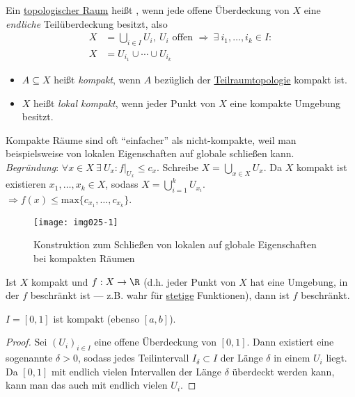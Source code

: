 \begin{definition}
  \label{def:kompakt}
  Ein \hyperref[def:topologie]{topologischer Raum} heißt , wenn jede offene Überdeckung von $ X $ eine \emph{endliche} Teilüberdeckung besitzt, also
  \begin{align*}
    X &= \bigcup_{i \in I} U_i, \ U_i \text{ offen } \Rightarrow \ \exists \ i_1, \dots, i_k \in I : \\
    X &= U_{i_1} \cup \cdots \cup U_{i_k}
  \end{align*}
  \begin{itemize}
    \item $ A \subseteq X $ heißt \emph{kompakt}, wenn $ A $ bezüglich der \hyperref[def:teilraumtopologie]{Teilraumtopologie} kompakt ist.
    \item $ X $ heißt \emph{lokal kompakt}, wenn jeder Punkt von $ X $ eine kompakte Umgebung besitzt.
  \end{itemize}
\end{definition}

\begin{remark}
  Kompakte Räume sind oft ``einfacher'' als nicht-kompakte, weil man beispielsweise von lokalen Eigenschaften auf globale schließen kann. \\
  \emph{Begründung}: $ \forall x \in X \ \exists \ U_x : f\vert_{U_x} \leq c_x $. Schreibe $ X = \bigcup_{x \in X}U_x $. Da $ X $ kompakt ist existieren $ x_1, \dots, x_k \in X $, sodass $ X = \bigcup_{i=1}^k U_{x_i} $. \\
  $ \Rightarrow f(x) \leq \text{max}\{ c_{x_1}, \dots, c_{x_k} \} $.
  \begin{figure}[H]
    \label{img025-1}
    \texttt{[image: img025-1]}
    \caption{Konstruktion zum Schließen von lokalen auf globale Eigenschaften bei kompakten Räumen}
  \end{figure}
\end{remark}

\begin{example}
  \label{bsp:beschraenkt}
  Ist $ X $ kompakt und $ f: X \to \R $  (d.h. jeder Punkt von $ X $ hat eine Umgebung, in der $ f $ beschränkt ist --- z.B. wahr für \hyperref[def:stetig]{stetige} Funktionen), dann ist $ f $ beschränkt.
\end{example}

\begin{example}
  $ I = [0,1] $ ist kompakt (ebenso $ [a,b] $).
  \begin{proof}
    Sei $ (U_i)_{i \in I} $ eine offene Überdeckung von $ [0,1] $. Dann existiert eine sogenannte \label{def:lebesgueZahl} $ \delta > 0 $, sodass jedes Teilintervall $ I_\delta \subset I $ der Länge $ \delta $ in einem $ U_i $ liegt. Da $ [0,1] $ mit endlich vielen Intervallen der Länge $ \delta $ überdeckt werden kann, kann man das auch mit endlich vielen $ U_i $.
  \end{proof}
\end{example}

